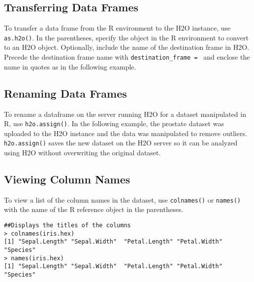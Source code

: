 {{\waterExampleInR
\medskip


\subsection{Transferring Data Frames}
To transfer a data frame from the R environment to the H2O instance, use  {\texttt{as.h2o()}}. In the parentheses, specify the object in the R environment to convert to an H2O object. Optionally, include the name of the destination frame in H2O. Precede the destination frame name with {\texttt{destination\_frame = }} and enclose the name in quotes as in the following example.

\waterExampleInR
\medskip



\subsection{Renaming Data Frames}
To rename a dataframe on the server running H2O for a dataset manipulated in R, use {\texttt{h2o.assign()}}. In the following example, the prostate dataset was uploaded to the H2O instance and the data was manipulated to remove outliers. {\texttt{h2o.assign()}} saves the new dataset on the H2O server so it can be analyzed using H2O without overwriting the original dataset.

\waterExampleInR
\medskip


\subsection{Viewing Column Names}
To view a list of the column names in the dataset, use {\texttt{colnames()}} or {\texttt{names()}} with the name of the R reference object in the parentheses.
\newpage
\waterExampleInR
\medskip

\begin{lstlisting}[style=R]
##Displays the titles of the columns
> colnames(iris.hex)
[1] "Sepal.Length" "Sepal.Width"  "Petal.Length" "Petal.Width"  "Species"     
> names(iris.hex)
[1] "Sepal.Length" "Sepal.Width"  "Petal.Length" "Petal.Width"  "Species"     
\end{lstlisting}

}}

